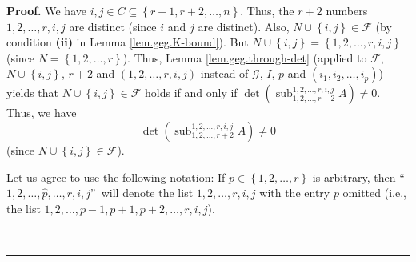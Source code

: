 \documentclass[numbers=enddot,12pt,final,onecolumn,notitlepage]{scrartcl}%
\theoremstyle{definition}
\newenvironment{proof}[1][Proof]{\noindent\textbf{#1.} }{\ \rule{0.5em}{0.5em}}
\theoremstyle{plainsl}
\begin{document}
\begin{proof}
We have $i,j\in C\subseteq\left\{  r+1,r+2,\ldots,n\right\}  $. Thus, the
$r+2$ numbers $1,2,\ldots,r,i,j$ are distinct (since $i$ and $j$ are
distinct). Also, $N\cup\left\{  i,j\right\}  \in\mathcal{F}$ (by condition
\textbf{(ii)} in Lemma \ref{lem.geg.K-bound}). But $N\cup\left\{  i,j\right\}
=\left\{  1,2,\ldots,r,i,j\right\}  $ (since $N=\left\{  1,2,\ldots,r\right\}
$). Thus, Lemma \ref{lem.geg.through-det} (applied to $\mathcal{F}$,
$N\cup\left\{  i,j\right\}  $, $r+2$ and $\left(  1,2,\ldots,r,i,j\right)  $
instead of $\mathcal{G}$, $I$, $p$ and $\left(  i_{1},i_{2},\ldots
,i_{p}\right)  $) yields that $N\cup\left\{  i,j\right\}  \in\mathcal{F}$
holds if and only if $\det\left(  \operatorname*{sub}\nolimits_{1,2,\ldots
,r+2}^{1,2,\ldots,r,i,j}A\right)  \neq0.$ Thus, we have
\begin{equation}
\det\left(  \operatorname*{sub}\nolimits_{1,2,\ldots,r+2}^{1,2,\ldots
,r,i,j}A\right)  \neq0 \label{pf.lem.geg.K-bound.c2.pf.neq0}%
\end{equation}
(since $N\cup\left\{  i,j\right\}  \in\mathcal{F}$).

Let us agree to use the following notation: If $p\in\left\{  1,2,\ldots
,r\right\}  $ is arbitrary, then \textquotedblleft$1,2,\ldots,\widehat{p}%
,\ldots,r,i,j$\textquotedblright\ will denote the list $1,2,\ldots,r,i,j$ with
the entry $p$ omitted (i.e., the list $1,2,\ldots,p-1,p+1,p+2,\ldots,r,i,j$).


\end{proof}
\end{document}
